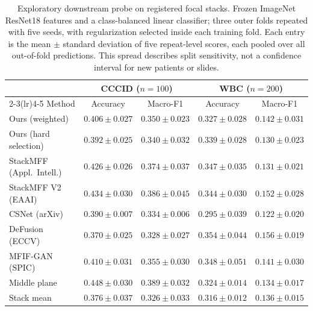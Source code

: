 \begin{table}[htbp]
\centering
\scriptsize
\setlength{\tabcolsep}{3pt}
\caption{Exploratory downstream probe on registered focal stacks. Frozen ImageNet ResNet18 features and a class-balanced linear classifier; three outer folds repeated with five seeds, with regularization selected inside each training fold. Each entry is the mean $\pm$ standard deviation of five repeat-level scores, each pooled over all out-of-fold predictions. This spread describes split sensitivity, not a confidence interval for new patients or slides.}
\label{tab:downstream}
\begin{tabular}{lcccc}
\toprule
 & \multicolumn{2}{c}{CCCID ($n=100$)} & \multicolumn{2}{c}{WBC ($n=200$)} \\
\cmidrule(lr){2-3}\cmidrule(lr){4-5}
Method & Accuracy & Macro-F1 & Accuracy & Macro-F1 \\
\midrule
Ours (weighted) & $0.406 \pm 0.027$ & $0.350 \pm 0.023$ & $0.327 \pm 0.028$ & $0.142 \pm 0.031$ \\
Ours (hard selection) & $0.392 \pm 0.025$ & $0.340 \pm 0.032$ & $0.339 \pm 0.028$ & $0.130 \pm 0.023$ \\
StackMFF (Appl.\ Intell.)~\cite{xie2025stackmff} & $0.426 \pm 0.026$ & $0.374 \pm 0.037$ & $0.347 \pm 0.035$ & $0.131 \pm 0.021$ \\
StackMFF V2 (EAAI)~\cite{xie2025stackmffv2} & $0.434 \pm 0.030$ & $0.386 \pm 0.045$ & $0.344 \pm 0.030$ & $0.152 \pm 0.028$ \\
CSNet (arXiv)~\cite{csnet2026} & $0.390 \pm 0.007$ & $0.334 \pm 0.006$ & $0.295 \pm 0.039$ & $0.122 \pm 0.020$ \\
DeFusion (ECCV)~\cite{liang2022defusion} & $0.370 \pm 0.025$ & $0.328 \pm 0.027$ & $0.354 \pm 0.044$ & $0.156 \pm 0.019$ \\
MFIF-GAN (SPIC)~\cite{wang2021mfifgan} & $0.410 \pm 0.031$ & $0.355 \pm 0.030$ & $0.348 \pm 0.051$ & $0.141 \pm 0.030$ \\
Middle plane & $0.448 \pm 0.030$ & $0.389 \pm 0.032$ & $0.324 \pm 0.014$ & $0.134 \pm 0.017$ \\
Stack mean & $0.376 \pm 0.037$ & $0.326 \pm 0.033$ & $0.316 \pm 0.012$ & $0.136 \pm 0.015$ \\
\bottomrule
\end{tabular}
\end{table}
